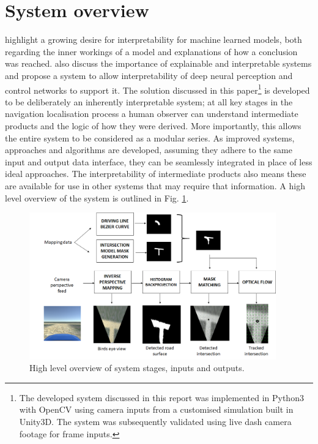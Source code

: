 \documentclass[]{aiaa-tc}%
\begin{document}
\section{System overview}
\citet{explainableAIStakeholders} highlight a growing desire for interpretability for machine learned models, both regarding the inner workings of a model and explanations of how a conclusion was reached. \citet{explainableCNNBookChapter} also discuss the importance of explainable and interpretable systems and propose a system to allow interpretability of deep neural perception and control networks to support it. The solution discussed in this paper\footnote{The developed system discussed in this report was implemented in Python3 with OpenCV using camera inputs from a customised simulation built in Unity3D. The system was subsequently validated using live dash camera footage for frame inputs.} is developed to be deliberately an inherently interpretable system; at all key stages in the navigation localisation process a human observer can understand intermediate products and the logic of how they were derived.  More importantly, this allows the entire system to be considered as a modular series. As improved systems, approaches and algorithms are developed, assuming they adhere to the same input and output data interface, they can be seamlessly integrated in place of less ideal approaches. The interpretability of intermediate products also means these are available for use in other systems that may require that information. A high level overview of the system is outlined in Fig. \ref{f:systemOverview}.

\begin{figure}
	\centering
	\includegraphics[width=0.95\textwidth]{systemOverview.png}
	\caption{High level overview of system stages, inputs and outputs.}
	\label{f:systemOverview}
\end{figure}
\end{document}
